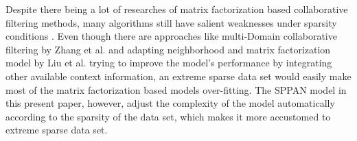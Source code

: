 Despite there being a lot of researches of matrix factorization based
collaborative filtering methods, many algorithms still have salient
weaknesses under sparsity conditions
\cite{cacheda2011comparison}. Even though there are approaches like
multi-Domain collaborative filtering by Zhang et al. and adapting
neighborhood and matrix factorization model by Liu et al. trying to
improve the model's performance by integrating other available context
information\cite{zhang2012multi, liu2010adapting}, an extreme sparse
data set would easily make most of the matrix factorization based
models over-fitting. The SPPAN model in this present paper, however,
adjust the complexity of the model automatically according to the
sparsity of the data set, which makes it more accustomed to extreme
sparse data set.
